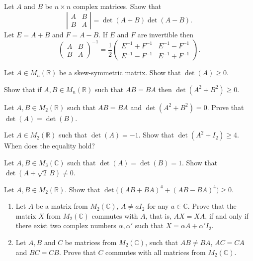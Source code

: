 \documentclass[12pt]{article}
\begin{document}
\begin{problem}
Let $A$ and $B$ be $n\times n$ complex matrices. Show that
\[
\left|\begin{matrix} A & B\\ B & A\end{matrix}\right| = \det(A+B)\det(A-B).
\]
Let $E=A+B$ and $F=A-B$. If $E$ and $F$ are invertible then
\[
\begin{pmatrix}A & B\\ B & A\end{pmatrix}^{-1} = \frac12\begin{pmatrix} E^{-1}+F^{-1} & E^{-1}-F^{-1}\\ E^{-1}-F^{-1} & E^{-1}+F^{-1}\end{pmatrix}.
\]
\end{problem}

\begin{problem}
Let $A\in M_n(\mathbb{R})$ be a skew-symmetric matrix. Show that $\det(A)\ge 0$.
\end{problem}

\begin{problem}
Show that if $A,B\in M_n(\mathbb{R})$ such that $AB=BA$ then $\det(A^2+B^2)\ge 0$.
\end{problem}

\begin{problem}
Let $A,B\in M_2(\mathbb{R})$ such that $AB=BA$ and $\det(A^2+B^2)=0$. Prove that $\det(A)=\det(B)$.
\end{problem}

\begin{problem}
Let $A\in M_2(\mathbb{R})$ such that $\det(A)=-1$. Show that $\det(A^2+I_2)\ge 4$. When does the equality hold?
\end{problem}

\begin{problem}
Let $A,B\in M_3(\mathbb{C})$ such that $\det(A)=\det(B)=1$. Show that $\det(A+\sqrt2\,B)\ne 0$.
\end{problem}

\begin{problem}
Let $A,B\in M_2(\mathbb{R})$. Show that $\det\big((AB+BA)^4+(AB-BA)^4\big) \ge 0$.
\end{problem}

\begin{problem}
\begin{enumerate}[label=(\alph*)]
\item Let $A$ be a matrix from $M_2(\mathbb{C})$, $A\ne aI_2$ for any $a\in\mathbb{C}$. Prove that the matrix $X$ from $M_2(\mathbb{C})$ commutes with $A$, that is, $AX=XA$, if and only if there exist two complex numbers $\alpha,\alpha'$ such that $X=\alpha A+\alpha' I_2$.
\item Let $A,B$ and $C$ be matrices from $M_2(\mathbb{C})$, such that $AB\ne BA$, $AC=CA$ and $BC=CB$. Prove that $C$ commutes with all matrices from $M_2(\mathbb{C})$.
\end{enumerate}
\end{problem}
\end{document}
